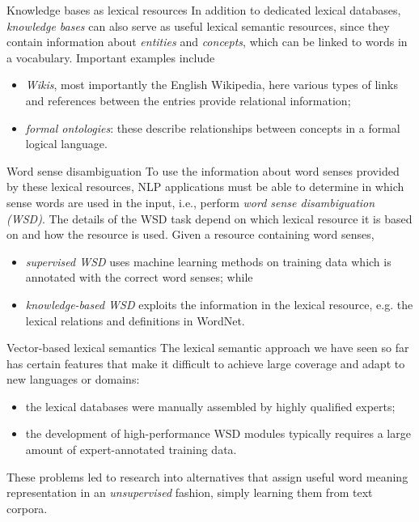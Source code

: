 \documentclass[style=upen, size=14pt]{powerdot}
\newcommand{\gold}{\color{arany}}
\theoremstyle{definition}
\begin{document}
\begin{slide}[toc=Knowledge bases]{Knowledge bases as lexical resources}
  In addition to dedicated lexical databases, \emph{knowledge bases} can also
  serve as useful lexical semantic resources, since they contain information
  about \emph{entities} and \emph{concepts}, which can be linked to words in a
  vocabulary. Important examples include
  \begin{itemize}
  \item \emph{Wikis}, most importantly the English Wikipedia, here various types
    of links and references between the entries provide relational information;
  \item \emph{formal ontologies}: these describe relationships between concepts
    in a formal logical language.
  \end{itemize}
\end{slide}

\begin{slide}[toc=WSD]{Word sense disambiguation}
  To use the information about word senses provided by these lexical resources,
  NLP applications must be able to determine in which sense words are used in
  the input, i.e., perform \emph{\gold word sense disambiguation (WSD)}.
  The details of the WSD task depend on which lexical resource it is based on
  and how the resource is used. Given a resource containing word senses, 

  \begin{itemize}
  \item \emph{\gold supervised WSD} uses machine learning methods on training data
    which is annotated with the correct word senses; while
  \item \emph{\gold knowledge-based WSD} exploits the information in the lexical
    resource, e.g. the lexical relations and definitions in WordNet.
  \end{itemize}
\end{slide}

\begin{slide}[toc=Word vectors]{Vector-based lexical semantics}
  The lexical semantic approach we have seen so far has certain features that
  make it difficult to achieve large coverage and adapt to new languages or
  domains:
  \begin{itemize}
  \item the lexical databases were manually assembled by highly qualified
    experts;
  \item the development of high-performance WSD modules typically requires a
    large amount of expert-annotated training data.
  \end{itemize}
  These problems led to research into alternatives that assign useful word
  meaning representation in an \emph{\gold unsupervised} fashion, simply
  learning them from text corpora.
\end{slide}
\end{document}

